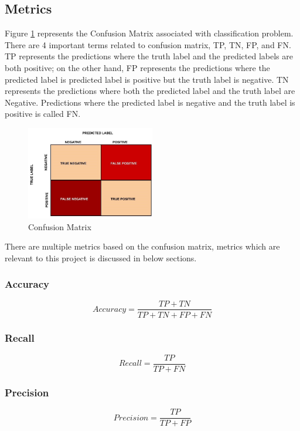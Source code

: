 \documentclass[twoside,11pt,a4paper]{article}
\begin{document}
\subsection{Metrics}
Figure \ref{fig:confusion_matrix} represents the Confusion Matrix associated with classification problem. There are 4 important terms related to confusion matrix, \acf{TP}, \acf{TN}, \acf{FP}, and \acf{FN}. \acs{TP} represents the predictions where the truth label and the predicted labels are both positive; on the other hand, \acs{FP} represents the predictions where the predicted label is predicted label is positive but the truth label is negative. \acs{TN} represents the predictions where both the predicted label and the truth label are Negative. Predictions where the predicted label is negative and the truth label is positive is called \acs{FN}.
\begin{figure}[ht]
	\centering
	\includegraphics[width=0.5\textwidth]{confusion_matrix}
	\caption[Confusion Matrix]{Confusion Matrix \citep{confusion_matrix}}
	\label{fig:confusion_matrix}
\end{figure}
There are multiple metrics based on the confusion matrix, metrics which are relevant to this project is discussed in below sections.
\subsubsection{Accuracy}
\begin{equation}
	Accuracy = \frac{TP+TN}{TP+TN+FP+FN}
\end{equation}
\subsubsection{Recall}
\begin{equation}
	Recall = \frac{TP}{TP+FN}
\end{equation}
\subsubsection{Precision}
\begin{equation}
	Precision = \frac{TP}{TP+FP}
\end{equation}
\end{document}
